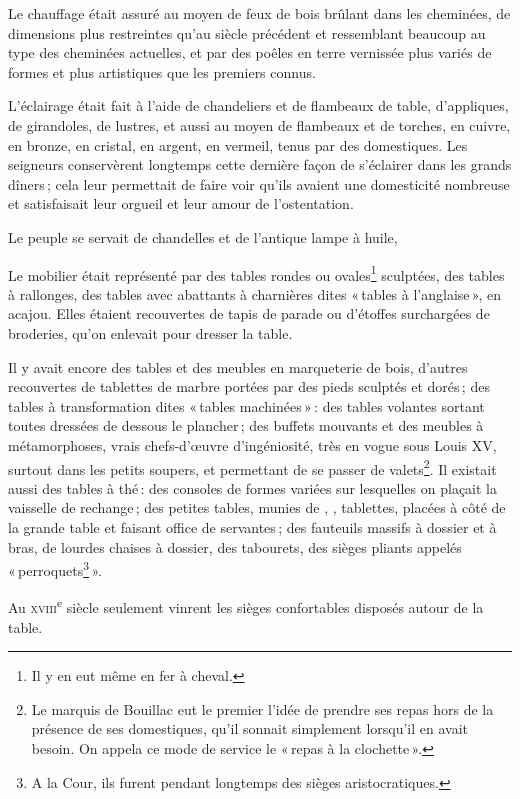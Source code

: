 Le chauffage était assuré au moyen de feux de bois brûlant dans les cheminées,
de dimensions plus restreintes qu'au siècle précédent et ressemblant beaucoup au
type des cheminées actuelles, et par des poêles en terre vernissée plus variés de
formes et plus artistiques que les premiers connus.

L'éclairage était fait à l'aide de chandeliers et de flambeaux de table,
d'appliques, de girandoles, de lustres, et aussi au moyen de flambeaux et de
torches, en cuivre, en bronze, en cristal, en argent, en vermeil, tenus par des
domestiques. Les seigneurs conservèrent longtemps cette dernière façon de
s'éclairer dans les grands dîners ; cela leur permettait de faire voir qu'ils
avaient une domesticité nombreuse et satisfaisait leur orgueil et leur amour de
l’ostentation.

Le peuple se servait de chandelles et de l'antique lampe à huile,

Le mobilier était représenté par des tables rondes ou ovales\footnote{Il y en
eut même en fer à cheval.} sculptées, des tables à rallonges, des tables avec
abattants à charnières dites « tables à l'anglaise », en acajou. Elles étaient
recouvertes de tapis de parade ou d'étoffes surchargées de broderies, qu'on
enlevait pour dresser la table.

Il y avait encore des tables et des meubles en marqueterie de bois, d’autres
recouvertes de tablettes de marbre portées par des pieds sculptés et dorés ;
des tables à transformation dites « tables machinées » : des tables volantes
sortant toutes dressées de dessous le plancher ; des buffets mouvants et des
meubles à métamorphoses, vrais chefs-d'œuvre d'ingéniosité, très en vogue sous
Louis XV, surtout dans les petits soupers, et permettant de se passer de
valets\footnote{Le marquis de Bouillac eut le premier l'idée de prendre ses
repas hors de la présence de ses domestiques, qu'il sonnait simplement
lorsqu'il en avait besoin. On appela ce mode de service le « repas à la
clochette ».}. Il existait aussi des tables à thé : des consoles de formes
variées sur lesquelles on plaçait la vaisselle de rechange ; des petites
tables, munies de {\mmm}, {\mmm}, {\mmm} tablettes, placées
à côté de la grande table et faisant office de servantes ; des fauteuils
massifs à dossier et à bras, de lourdes chaises à dossier, des tabourets, des
sièges pliants appelés « perroquets\footnote{A la Cour, ils furent pendant
longtemps des sièges aristocratiques.} ».

Au \textsc{xviii}\textsuperscript{e} siècle seulement vinrent les sièges
confortables disposés autour de la table.

